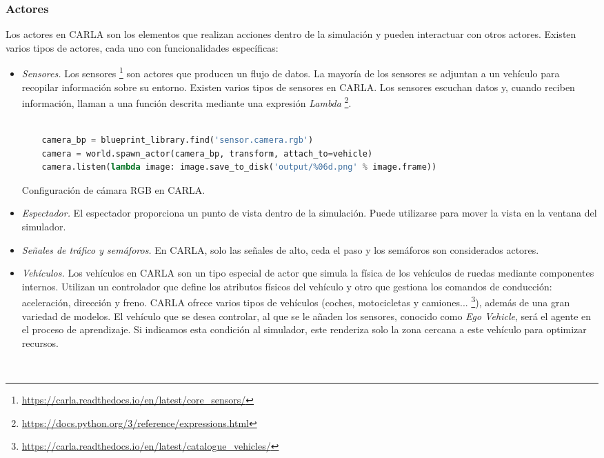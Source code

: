 \subsubsection{Actores}

Los actores en CARLA son los elementos que realizan acciones dentro de la simulación y pueden interactuar con otros actores. Existen varios tipos de actores, cada uno con funcionalidades específicas:


\begin{itemize}
    \item \textit{Sensores.} Los sensores \footnote{\url{https://carla.readthedocs.io/en/latest/core_sensors/}} son actores que producen un flujo de datos. La mayoría de los sensores se adjuntan a un vehículo para recopilar información sobre su entorno. Existen varios tipos de sensores en CARLA. Los sensores escuchan datos y, cuando reciben información, llaman a una función descrita mediante una expresión \textit{Lambda} \footnote{\url{https://docs.python.org/3/reference/expressions.html}}. 

	\begin{code}[h]
	\begin{lstlisting}[language=python]
	
	camera_bp = blueprint_library.find('sensor.camera.rgb')
	camera = world.spawn_actor(camera_bp, transform, attach_to=vehicle)
	camera.listen(lambda image: image.save_to_disk('output/%06d.png' % image.frame))

	\end{lstlisting}
	\caption[Configuración de cámara RGB en CARLA]{Configuración de cámara RGB en CARLA.}
	\label{cod:camara_carla}
	\end{code}

    \item \textit{Espectador.} El espectador  proporciona un punto de vista dentro de la simulación. Puede utilizarse para mover la vista en la ventana del simulador.
    \item \textit{Señales de tráfico y semáforos.} En CARLA, solo las señales de alto, ceda el paso y los semáforos son considerados actores.

    \item  \textit{Vehículos.} Los vehículos en CARLA son un tipo especial de actor que simula la física de los vehículos de ruedas mediante componentes internos. Utilizan un controlador que define los atributos físicos del vehículo y otro que gestiona los comandos de conducción: aceleración, dirección y freno. CARLA ofrece varios tipos de vehículos (coches, motocicletas y camiones... \footnote{\url{https://carla.readthedocs.io/en/latest/catalogue_vehicles/}}), además de una gran variedad de modelos. El vehículo que se desea controlar, al que se le añaden los sensores, conocido como \textit{Ego Vehicle}, será el agente en el proceso de aprendizaje. Si indicamos esta condición al simulador, este renderiza solo la zona cercana a este vehículo para optimizar recursos.
	\begin{code}[h]
	\begin{lstlisting}[language=python]
	

\end{lstlisting}
\end{code}
\end{itemize}
